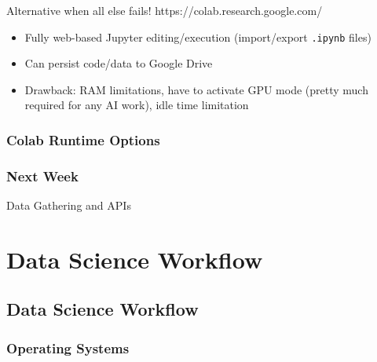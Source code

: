 \documentclass[
  letterpaper,
  DIV=11,
  numbers=noendperiod,
  oneside]{scrreprt}
\providecommand{\tightlist}{%
  \setlength{\itemsep}{0pt}\setlength{\parskip}{0pt}}\usepackage{longtable,booktabs,array}
\begin{document}
Alternative when all else fails! https://colab.research.google.com/

\begin{itemize}
\tightlist
\item
  Fully web-based Jupyter editing/execution (import/export
  \texttt{.ipynb} files)
\item
  Can persist code/data to Google Drive
\item
  Drawback: RAM limitations, have to activate GPU mode (pretty much
  required for any AI work), idle time limitation
\end{itemize}

\hypertarget{colab-runtime-options}{%
\section{Colab Runtime Options}\label{colab-runtime-options}}

\hypertarget{next-week}{%
\section{Next Week}\label{next-week}}

Data Gathering and APIs

\part{Data Science Workflow}

\hypertarget{data-science-workflow-1}{%
\chapter{Data Science Workflow}\label{data-science-workflow-1}}

\hypertarget{operating-systems-1}{%
\section{Operating Systems}\label{operating-systems-1}}
\end{document}
